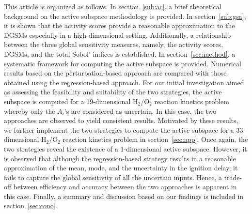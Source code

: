 This article is organized as follows. In section~\ref{sub:ac}, a brief
theoretical background on the active subspace methodology is provided. In
section~\ref{sub:gsa}, it is shown that the activity scores provide a
reasonable approximation to the DGSMs especially in a high-dimensional setting.
Additionally, a relationship between the three global sensitivity measures,
namely, the activity scores, DGSMs, and the total Sobol' indices is
established. In section~\ref{sec:method}, a systematic framework for computing
the active subspace is provided. 
Numerical results based on the perturbation-based approach are compared with those
obtained using the regression-based approach.  For our initial investigation aimed
as assessing the feasibility and suitability of the two strategies, the active 
subspace is computed for a 19-dimensional 
H$_2$/O$_2$ reaction kinetics problem whereby only the $A_i$'s are
considered as uncertain. In this case, the two approaches are observed to yield
consistent results. Motivated by these results, we further implement the two
strategies to compute the active subspace for a 33-dimensional H$_2$/O$_2$
reaction kinetics problem in section~\ref{sec:app}. Once again, the two
strategies reveal the existence of a 1-dimensional active subspace. However,
it is observed that although the regression-based strategy results in a 
reasonable approximation of the mean, mode, and the uncertainty in the ignition
delay, it fails to capture the global sensitivity of all the uncertain inputs. 
Hence, a trade-off between efficiency and accuracy between the two approaches is
apparent in this case.  Finally, a summary and discussion based on our findings is included in
section~\ref{sec:conc}.










 




